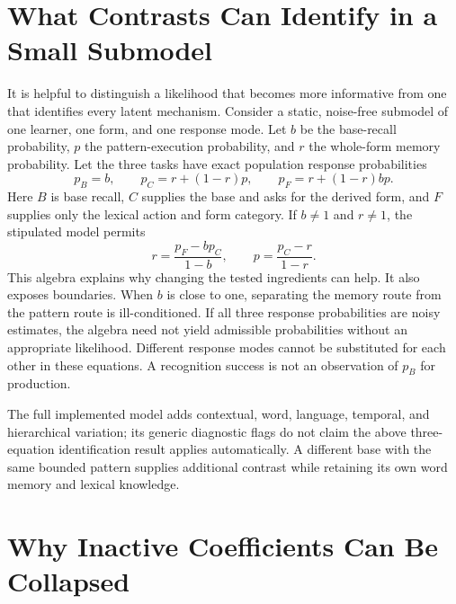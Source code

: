 \clearpage
\appendix
\section{What Contrasts Can Identify in a Small Submodel}

It is helpful to distinguish a likelihood that becomes more informative from
one that identifies every latent mechanism. Consider a static, noise-free
submodel of one learner, one form, and one response mode. Let \(b\) be the
base-recall probability, \(p\) the pattern-execution probability, and \(r\)
the whole-form memory probability. Let the three tasks have exact population
response probabilities
\begin{equation}
 p_B=b,\qquad
 p_C=r+(1-r)p,\qquad
 p_F=r+(1-r)bp .
\end{equation}
Here \(B\) is base recall, \(C\) supplies the base and asks for the derived
form, and \(F\) supplies only the lexical action and form category.
If \(b\ne1\) and \(r\ne1\), the stipulated model permits
\begin{equation}
 r=\frac{p_F-bp_C}{1-b},\qquad
 p=\frac{p_C-r}{1-r}.
\end{equation}
This algebra explains why changing the tested ingredients can help.
It also exposes boundaries. When \(b\) is close to one, separating the memory
route from the pattern route is ill-conditioned. If all three response
probabilities are noisy estimates, the algebra need not yield admissible
probabilities without an appropriate likelihood. Different response modes
cannot be substituted for each other in these equations. A recognition
success is not an observation of \(p_B\) for production.

The full implemented model adds contextual, word, language, temporal, and
hierarchical variation; its generic diagnostic flags do not claim the above
three-equation identification result applies automatically. A different base
with the same bounded pattern supplies additional contrast while retaining
its own word memory and lexical knowledge.

\section{Why Inactive Coefficients Can Be Collapsed}

